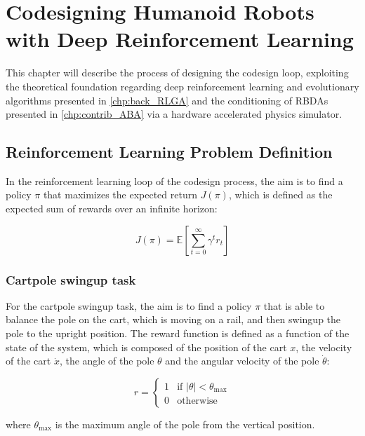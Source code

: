 \chapter{Codesigning Humanoid Robots with Deep Reinforcement Learning}
\label{chp:contrib_CodesignRL}

This chapter will describe the process of designing the codesign loop, exploiting the theoretical foundation regarding deep reinforcement learning and evolutionary algorithms presented in \cref{chp:back_RLGA} and the conditioning of \ac{RBDA}s presented in \cref{chp:contrib_ABA} via a hardware accelerated physics simulator.

\section{Reinforcement Learning Problem Definition}

In the reinforcement learning loop of the codesign process, the aim is to find a policy $\pi$ that maximizes the expected return $J(\pi)$, which is defined as the expected sum of rewards over an infinite horizon:

\begin{equation}
    J(\pi) = \mathbb{E} \left[ \sum_{t=0}^{\infty} \gamma ^t r_t \right]
\end{equation}



\subsection{Cartpole swingup task}
For the cartpole swingup task, the aim is to find a policy $\pi$ that is able to balance the pole on the cart, which is moving on a rail, and then swingup the pole to the upright position. The reward function is defined as a function of the state of the system, which is composed of the position of the cart $x$, the velocity of the cart $\dot{x}$, the angle of the pole $\theta$ and the angular velocity of the pole $\dot{\theta}$:

\begin{equation}
    r = \begin{cases}
        1 & \text{if } \left| \theta \right| < \theta_{\text{max}} \\
        0 & \text{otherwise}
    \end{cases}
\end{equation}

where $\theta_{\text{max}}$ is the maximum angle of the pole from the vertical position.


